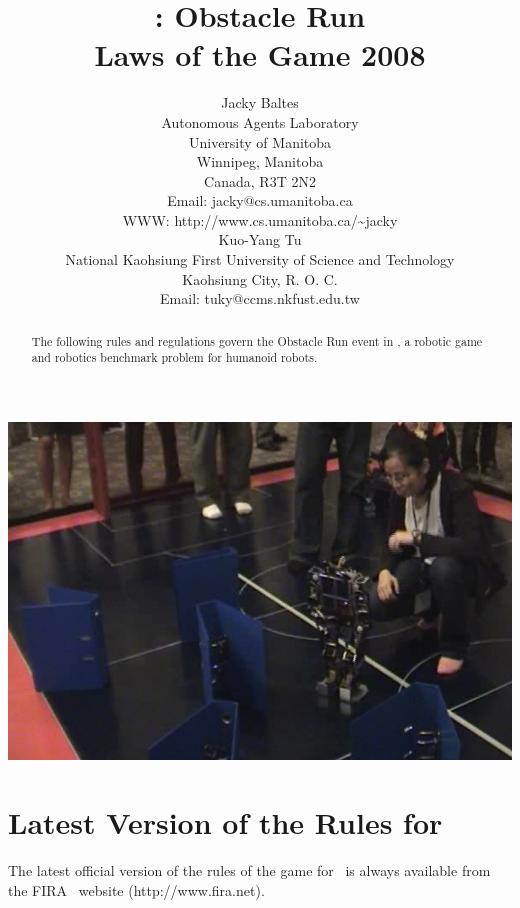 \documentclass[12pt]{hurocup}
\begin{document}
\title{\HuroCup: Obstacle Run\\
  Laws of the Game 2008}


\author{Jacky Baltes\\
Autonomous Agents Laboratory\\
University of Manitoba\\
Winnipeg, Manitoba\\
Canada, R3T 2N2\\
Email: jacky@cs.umanitoba.ca\\
WWW: http://www.cs.umanitoba.ca/\~{ }jacky\\[5mm]
Kuo-Yang Tu\\
National Kaohsiung First University of Science and Technology\\
Kaohsiung City, R. O. C.\\
Email: tuky@ccms.nkfust.edu.tw\\
}

\maketitle

\begin{center}
 \includegraphics[width=0.7\linewidth]{Figures/obstacle-run-life}
\end{center}

\begin{abstract}
The following rules and regulations govern the Obstacle Run event in
\HuroCup, a robotic game and robotics benchmark problem for humanoid
robots.
%
\end{abstract}

\section*{Latest Version of the Rules for \HuroCup}
\label{sec:updates}

The latest official version of the rules of the game for \HuroCup\ is
always available from the FIRA \HuroCup\ website (http://www.fira.net).
\end{document}
